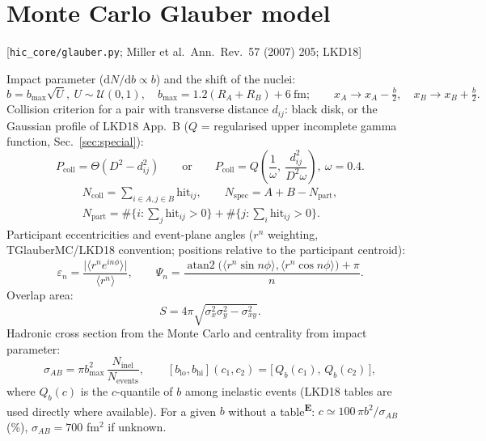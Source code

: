 \documentclass[11pt,a4paper]{article}
\newcommand{\file}[1]{\texttt{\small #1}}
\newcommand{\src}[1]{\hfill{\small\color{gray}[#1]}}
\newcommand{\emp}{\textsuperscript{\color{orange!80!black}\textbf{E}}}
\begin{document}
\section{Monte Carlo Glauber model}
\src{\file{hic\_core/glauber.py}; Miller et al.\ Ann.\ Rev.\ 57 (2007) 205; LKD18}

Impact parameter ($\mathrm dN/\mathrm db\propto b$) and the shift of the nuclei:
\begin{equation}
b = b_\text{max}\sqrt{U},\ U\sim\mathcal U(0,1),\quad b_\text{max} = 1.2(R_A+R_B)+6~\text{fm};\qquad
x_A \to x_A - \tfrac b2,\quad x_B\to x_B+\tfrac b2 .
\end{equation}
Collision criterion for a pair with transverse distance $d_{ij}$: black disk, or the Gaussian profile of LKD18 App.~B
($Q$ = regularised upper incomplete gamma function, Sec.~\ref{sec:special}):
\begin{equation}
P_\text{coll} = \Theta(D^2-d_{ij}^2)\qquad\text{or}\qquad
P_\text{coll} = Q\!\left(\frac1\omega,\ \frac{d_{ij}^2}{D^2\omega}\right),\ \omega=0.4 .
\end{equation}
\begin{gather}
N_\text{coll} = \sum_{i\in A,j\in B}\text{hit}_{ij},\qquad N_\text{spec} = A+B-N_\text{part},\nonumber\\
N_\text{part} = \#\{i: \textstyle\sum_j \text{hit}_{ij}>0\} + \#\{j: \textstyle\sum_i \text{hit}_{ij}>0\}.
\end{gather}
Participant eccentricities and event-plane angles ($r^n$ weighting, TGlauberMC/LKD18 convention; positions relative to
the participant centroid):
\begin{equation}
\varepsilon_n = \frac{\big|\langle r^n e^{in\phi}\rangle\big|}{\langle r^n\rangle},\qquad
\Psi_n = \frac{\operatorname{atan2}\!\big(\langle r^n\sin n\phi\rangle,\langle r^n\cos n\phi\rangle\big)+\pi}{n}.
\end{equation}
Overlap area:
\begin{equation}
S = 4\pi\sqrt{\sigma_x^2\sigma_y^2-\sigma_{xy}^2}.
\end{equation}
Hadronic cross section from the Monte Carlo and centrality from impact parameter:
\begin{equation}
\sigma_{AB} = \pi b_\text{max}^2\,\frac{N_\text{inel}}{N_\text{events}},\qquad
[b_\text{lo},b_\text{hi}](c_1,c_2) = \big[\,Q_b(c_1),\,Q_b(c_2)\,\big],
\end{equation}
where $Q_b(c)$ is the $c$-quantile of $b$ among inelastic events (LKD18 tables are used directly where available).
For a given $b$ without a table\emp: $c \simeq 100\,\pi b^2/\sigma_{AB}$ (\%), $\sigma_{AB}=700$ fm$^2$ if unknown.
\end{document}
